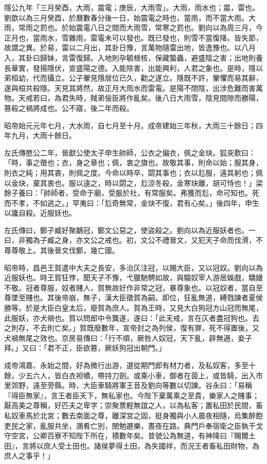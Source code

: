 \begin{pinyinscope}
隱公九年「三月癸酉，大雨，震電；庚辰，大雨雪」。大雨，雨水也；震，雷也。劉歆以為三月癸酉，於曆數春分後一日，始震電之時也，當雨，而不當大雨。大雨，常雨之罰也。於始震電八日之間而大雨雪，常寒之罰也。劉向以為周三月，今正月也，當雨水，雪雜雨，雷電未可以發也。既已發也，則雪不當復降。皆失節，故謂之異。於易，雷以二月出，其卦日豫，言萬物隨雷出地，皆逸豫也。以八月入，其卦曰歸妹，言雷復歸。入地則孕毓根核，保藏蟄蟲，避盛陰之害；出地則養長華實，發揚隱伏，宣盛陽之德。入能除害，出能興利，人君之象也。是時，隱以弟桓幼，代而攝立。公子翬見隱居位已久，勸之遂立。隱既不許，翬懼而易其辭，遂與桓共殺隱。天見其將然，故正月大雨水而雷電。是陽不閉陰，出涉危難而害萬物。天戒若曰，為君失時，賊弟佞臣將作亂矣。後八日大雨雪，陰見間隙而勝陽，篡殺之禍將成也。公不寤，後二年而殺。

昭帝始元元年七月，大水雨，自七月至十月。成帝建始三年秋，大雨三十餘日；四年九月，大雨十餘日。

左氏傳愍公二年，晉獻公使太子申生帥師，公衣之偏衣，佩之金玦。狐突歎曰：「時，事之徵也；衣，身之章也；佩，衷之旗也。故敬其事，則命以始；服其身，則衣之純；用其衷，則佩之度。今命以時卒，閟其事也；衣以尨服，遠其躬也；佩以金玦，棄其衷也。服以遠之，時以閟之，尨涼冬殺，金寒玦離，胡可恃也！」梁餘子養曰：「帥師者，受命于廟，受脤於社，有常服矣。弗獲而尨，命可知也。死而不孝，不如逃之。」罕夷曰：「尨奇無常，金玦不復，君有心矣。」後四年，申生以讒自殺。近服妖也。

左氏傳曰，鄭子臧好聚鷸冠，鄭文公惡之，使盜殺之。劉向以為近服妖者也。一曰，非獨為子臧之身，亦文公之戒也。初，文公不禮晉文，又犯天子命而伐滑，不尊尊敬上。其後晉文伐鄭，幾亡國。

昭帝時，昌邑王賀遣中大夫之長安，多治仄注冠，以賜大臣，又以冠奴。劉向以為近服妖也。時王賀狂悖，聞天子不豫，弋獵馳騁如故，與騶奴宰人游居娛戲，驕嫚不敬。冠者尊服，奴者賤人，賀無故好作非常之冠，暴尊象也。以冠奴者，當自至尊墜至賤也。其後帝崩，無子，漢大臣徵賀為嗣。即位，狂亂無道，縛戮諫者夏侯勝等。於是大臣白皇太后，廢賀為庶人。賀為王時，又見大白狗冠方山冠而無尾，此服妖，亦犬禍也。賀以問郎中令龔遂，遂曰：「此天戒，言在仄者盡冠狗也。去之則存，不去則亡矣。」賀既廢數年，宣帝封之為列侯，復有罪，死不得置後，又犬禍無尾之效也。京房易傳曰：「行不順，厥咎人奴冠，天下亂，辟無適，妾子拜。」又曰：「君不正，臣欲篡，厥妖狗冠出朝門。」

成帝鴻嘉、永始之間，好為微行出游，選從期門郎有材力者，及私奴客，多至十餘，少五六人，皆白衣袒幘，帶持刀劍。或乘小車，御者在茵上，或皆騎，出入市里郊野，遠至旁縣。時，大臣車騎將軍王音及劉向等數以切諫。谷永曰：「易稱『得臣無家』，言王者臣天下，無私家也。今陛下棄萬乘之至貴，樂家人之賤事；厭高美之尊稱，好匹夫之卑字；崇聚票輕無誼之人，以為私客；置私田於民間，畜私奴車馬於北宮；數去南面之尊，離深宮之固，挺身獨與小人晨夜相隨，烏集醉飽吏民之家，亂服共坐，溷肴亡別，閔勉遯樂，晝夜在路。典門戶奉宿衛之臣執干戈守空宮，公卿百寮不知陛下所在，積數年矣。昔虢公為無道，有神降曰『賜爾土田』，言將以庶人受土田也。諸侯夢得土田，為失國祥，而況王者畜私田財物，為庶人之事乎！」


\end{pinyinscope}
